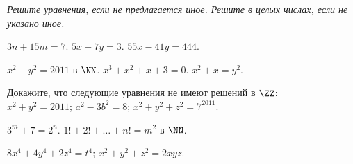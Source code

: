 
\emph{%
Решите уравнения, если не предлагается иное.
Решите в целых числах, если не указано иное.}

\begingroup\def\amethod{\vspace{-2ex}\subsubsection*}


\begin{problems}

\item
$3n + 15 m = 7$.
\qquad
\problem
$5 x - 7 y = 3$.
\qquad
\problem
$55 x - 41 y = 444$.

\end{problems}


\begin{problems}

\item
$x^2 - y^2 = 2011$\; в $\NN$.
\qquad
\problem
$x^3 + x^2 + x + 3 = 0$.
\qquad
\problem
$x^2 + x = y^2$.

\end{problems}


\begin{problems}

\item
Докажите, что следующие уравнения не имеют решений в $\ZZ$:
\\
\sbp $x^2 + y^2 = 2011$;
\qquad
\sbp $a^2 - 3 b^2 = 8$;
\qquad
\sbp $x^2 + y^2 + z^2 = 7^{2011}$.

\item
$3^m + 7 = 2^n$.
\qquad
\problem
$1! + 2! + \ldots + n! = m^2$\; в $\NN$.

\end{problems}


\begin{problems}

\item
$8 x^4 + 4 y^4 + 2 z^4 = t^4$;
\qquad
\problem
$x^2 + y^2 + z^2 = 2 x y z$.

\end{problems}

